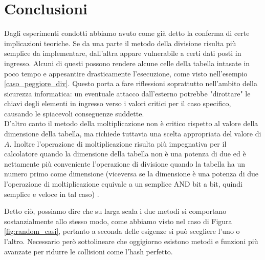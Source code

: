 \newpage
\section{Conclusioni}

Dagli esperimenti condotti abbiamo avuto come già detto la conferma di certe implicazioni teoriche. Se da una parte il metodo della divisione risulta più semplice da implementare, dall'altra appare vulnerabile a certi dati posti in ingresso. Alcuni di questi possono rendere alcune celle della tabella intasate in poco tempo e appesantire drasticamente l'esecuzione, come visto nell'esempio \ref{caso_peggiore_div}. Questo porta a fare riflessioni soprattutto nell'ambito della sicurezza informatica: un eventuale attacco dall'esterno potrebbe "dirottare" le chiavi degli elementi in ingresso verso i valori critici per il caso specifico, causando le spiacevoli conseguenze suddette. 
\\ D'altro canto il metodo della moltiplicazione non è critico rispetto al valore della dimensione della tabella, ma richiede tuttavia una scelta appropriata del valore di $A$. Inoltre l'operazione di moltiplicazione risulta più impegnativa per il calcolatore quando la dimensione della tabella non è una potenza di due ed è nettamente più conveniente l'operazione di divisione quando la tabella ha un numero primo come dimensione (viceversa se la dimensione è una potenza di due l'operazione di moltiplicazione equivale a un semplice AND bit a bit, quindi semplice e veloce in tal caso) \cite{Stack}.

Detto ciò, possiamo dire che su larga scala i due metodi si comportano sostanzialmente allo stesso modo, come abbiamo visto nel caso di Figura \ref{fig:random_casi}, pertanto a seconda delle esigenze si può scegliere l'uno o l'altro. Necessario però sottolineare che oggigiorno esistono metodi e funzioni più avanzate per ridurre le collisioni come l'hash perfetto.
